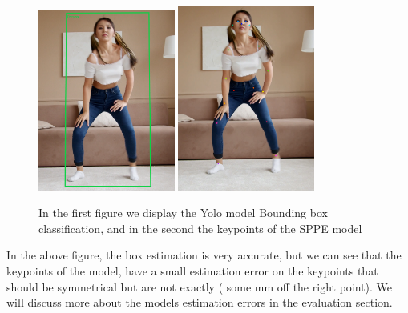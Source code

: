 \begin{figure}[htp]
    \centering
    \includegraphics[width=0.4\textwidth]{figures/Implementation/YoloModel.png}%
    \qquad
    \includegraphics[width=0.4\textwidth]{figures/Implementation/SPPE.png}%
    \qquad
    \captionsetup{labelformat=empty}
    \caption{In the first figure we display the Yolo model Bounding box classification, and in the second the keypoints of the SPPE model}%
\end{figure}


In the above figure, the box estimation is very accurate, but we can see that the keypoints of the model, have a small estimation error on the keypoints that should be symmetrical but are not exactly ( some mm off the right point). We will discuss more about the models estimation errors in the evaluation section.